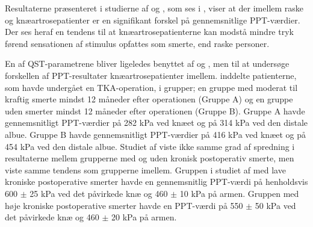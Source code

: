 \begin{table}[H]
	\centering
	\caption{I tabellen ses resultaterne vedrørende PPT-målinger på henholdsvis raske person og knæartrsoe patienter. Som det kan ses for reviewet af , overlapper PPT for kontrol- og patientgruppen.}
	\label{tab:PPT_rask_syg}
\end{table}\vspace{-.25cm}

Resultaterne præsenteret i studierne af  og , som ses i , viser at der imellem raske og knæartrosepatienter er en signifikant forskel på gennemsnitlige PPT-værdier. Der ses heraf en tendens til at knæartrosepatienterne kan modstå mindre tryk førend sensationen af stimulus opfattes som smerte, end raske personer.

En af QST-parametrene bliver ligeledes benyttet af  og , men til at undersøge forskellen af PPT-resultater knæartrosepatienter imellem.  inddelte patienterne, som havde undergået en TKA-operation, i grupper; en gruppe med moderat til kraftig smerte mindst 12 måneder efter operationen (Gruppe A) og en gruppe uden smerter mindst 12 måneder efter operationen (Gruppe B). Gruppe A havde gennemsnitligt PPT-værdier på 282 kPa ved knæet og på 314 kPa ved den distale albue. Gruppe B havde gennemsnitligt PPT-værdier på 416 kPa ved knæet og på 454 kPa ved den distale albue. Studiet af  viste ikke samme grad af spredning i resultaterne mellem grupperne med og uden kronisk postoperativ smerte, men viste samme tendens som  grupperne imellem. Gruppen i studiet af  med lave kroniske postoperative smerter havde en gennemsnitlig PPT-værdi på henholdsvis 600 $\pm$ 25 kPa ved det påvirkede knæ og 460 $\pm$ 10 kPa på armen. Gruppen med høje kroniske postoperative smerter havde en PPT-værdi på 550 $\pm$ 50 kPa ved det påvirkede knæ og 460 $\pm$ 20 kPa på armen. \citep{Petersen2015}

